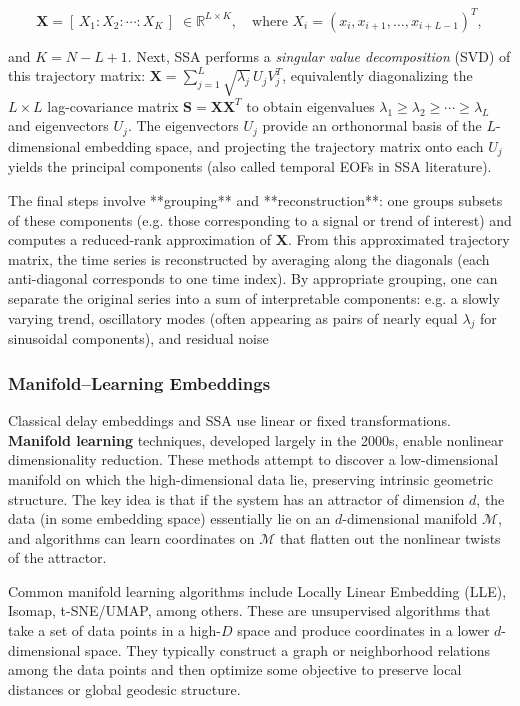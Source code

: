 \documentclass[14pt]{extarticle}
\begin{document}
	$$ 
	\mathbf{X} = [\,X_1 : X_2 : \cdots : X_K\,] \;\in \mathbb{R}^{L \times K}, \quad \text{where } X_i = (x_i, x_{i+1}, \dots, x_{i+L-1})^T, 
	$$ 
	
	and $K = N - L + 1$. 
	Next, SSA performs a \textit{singular value decomposition} (SVD) of this trajectory matrix: $\mathbf{X} = \sum_{j=1}^L \sqrt{\lambda_j}\,U_j V_j^T$, equivalently diagonalizing the $L\times L$ lag-covariance matrix $\mathbf{S} = \mathbf{X}\mathbf{X}^T$ to obtain eigenvalues $\lambda_1 \ge \lambda_2 \ge \cdots \ge \lambda_L$ and eigenvectors $U_j$. The eigenvectors $U_j$ provide an orthonormal basis of the $L$-dimensional embedding space, and projecting the trajectory matrix onto each $U_j$ yields the principal components (also called temporal EOFs in SSA literature). 
	
	The final steps involve **grouping** and **reconstruction**: one groups subsets of these components (e.g. those corresponding to a signal or trend of interest) and computes a reduced-rank approximation of $\mathbf{X}$. From this approximated trajectory matrix, the time series is reconstructed by averaging along the diagonals (each anti-diagonal corresponds to one time index).
	By appropriate grouping, one can separate the original series into a sum of interpretable components: e.g. a slowly varying trend, oscillatory modes (often appearing as pairs of nearly equal $\lambda_j$ for sinusoidal components), and residual noise
	
	\subsubsection{Manifold–Learning Embeddings}
	
	Classical delay embeddings and SSA use linear or fixed transformations. \textbf{Manifold learning} techniques, developed largely in the 2000s, enable nonlinear dimensionality reduction. 
	These methods attempt to discover a low-dimensional manifold on which the high-dimensional data lie, preserving intrinsic geometric structure.
	The key idea is that if the system has an attractor of dimension $d$, the data (in some embedding space) essentially lie on an $d$-dimensional manifold $\mathcal{M}$, and algorithms can learn coordinates on $\mathcal{M}$ that flatten out the nonlinear twists of the attractor.
	
	Common manifold learning algorithms include Locally Linear Embedding (LLE), Isomap, t-SNE/UMAP, among others.
	These are unsupervised algorithms that take a set of data points in a high-$D$ space and produce coordinates in a lower $d$-dimensional space.
	They typically construct a graph or neighborhood relations among the data points and then optimize some objective to preserve local distances or global geodesic structure.
	
\end{document}
